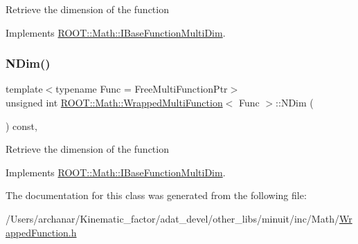 Retrieve the dimension of the function 

Implements \mbox{\hyperlink{classROOT_1_1Math_1_1IBaseFunctionMultiDim_a16f37dc7a6d00c75ddeda0697741315d}{R\+O\+O\+T\+::\+Math\+::\+I\+Base\+Function\+Multi\+Dim}}.

\mbox{\label{classROOT_1_1Math_1_1WrappedMultiFunction_a99de9f7a6e26b03b1cdcf35d8c62d761}} 
\subsubsection{\texorpdfstring{NDim()}{NDim()}\hspace{0.1cm}{\footnotesize\ttfamily [2/2]}}
{\footnotesize\ttfamily template$<$typename Func  = Free\+Multi\+Function\+Ptr$>$ \\
unsigned int \mbox{\hyperlink{classROOT_1_1Math_1_1WrappedMultiFunction}{R\+O\+O\+T\+::\+Math\+::\+Wrapped\+Multi\+Function}}$<$ Func $>$\+::N\+Dim (\begin{DoxyParamCaption}{ }\end{DoxyParamCaption}) const\hspace{0.3cm}{\ttfamily [inline]}, {\ttfamily [virtual]}}

Retrieve the dimension of the function 

Implements \mbox{\hyperlink{classROOT_1_1Math_1_1IBaseFunctionMultiDim_a16f37dc7a6d00c75ddeda0697741315d}{R\+O\+O\+T\+::\+Math\+::\+I\+Base\+Function\+Multi\+Dim}}.



The documentation for this class was generated from the following file\+:\begin{DoxyCompactItemize}
\item 
/\+Users/archanar/\+Kinematic\+\_\+factor/adat\+\_\+devel/other\+\_\+libs/minuit/inc/\+Math/\mbox{\hyperlink{other__libs_2minuit_2inc_2Math_2WrappedFunction_8h}{Wrapped\+Function.\+h}}\end{DoxyCompactItemize}
